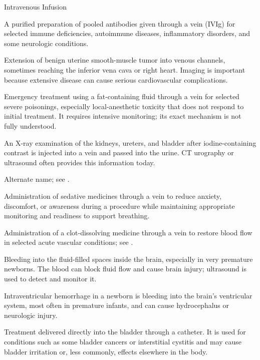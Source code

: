 \synonyms
Intravenous Infusion

 A purified preparation of pooled antibodies given through a vein (IVIg) for selected immune deficiencies, autoimmune diseases, inflammatory disorders, and some neurologic conditions.

 Extension of benign uterine smooth-muscle tumor into venous channels, sometimes reaching the inferior vena cava or right heart. Imaging is important because extensive disease can cause serious cardiovascular complications.

 Emergency treatment using a fat-containing fluid through a vein for selected severe poisonings, especially local-anesthetic toxicity that does not respond to initial treatment. It requires intensive monitoring; its exact mechanism is not fully understood.

 An X-ray examination of the kidneys, ureters, and bladder after iodine-containing contrast is injected into a vein and passed into the urine. CT urography or ultrasound often provides this information today.

 Alternate name; see .

 Administration of sedative medicines through a vein to reduce anxiety, discomfort, or awareness during a procedure while maintaining appropriate monitoring and readiness to support breathing.

 Administration of a clot-dissolving medicine through a vein to restore blood flow in selected acute vascular conditions; see .

 Bleeding into the fluid-filled spaces inside the brain, especially in very premature newborns. The blood can block fluid flow and cause brain injury; ultrasound is used to detect and monitor it.

 Intraventricular hemorrhage in a newborn is bleeding into the brain’s ventricular system, most often in premature infants, and can cause hydrocephalus or neurologic injury.

 Treatment delivered directly into the bladder through a catheter. It is used for conditions such as some bladder cancers or interstitial cystitis and may cause bladder irritation or, less commonly, effects elsewhere in the body.

